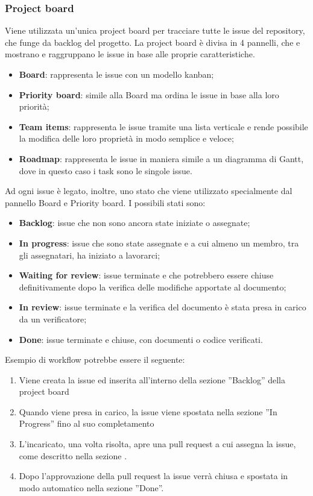 \subsubsection{Project board}\label{inf:pb}
Viene utilizzata un'unica project board per tracciare tutte le issue del
repository, che funge da backlog del progetto. La project board è divisa in 4
pannelli, che e mostrano e raggruppano le issue in base alle proprie
caratteristiche.
\begin{itemize}
    \item \textbf{Board}: rappresenta le issue con un modello kanban;
    \item \textbf{Priority board}: simile alla Board ma ordina le issue in base alla loro priorità;
    \item \textbf{Team items}: rappresenta le issue tramite una lista verticale e rende possibile
          la modifica delle loro proprietà in modo semplice e veloce;
    \item \textbf{Roadmap}: rappresenta le issue in maniera simile a un diagramma di Gantt,
          dove in questo caso i task sono le singole issue.
\end{itemize}
Ad ogni issue è legato, inoltre, uno stato che viene utilizzato specialmente dal pannello Board e Priority board.
I possibili stati sono:
\begin{itemize}
    \item \textbf{Backlog}: issue che non sono ancora state iniziate o assegnate;
    \item \textbf{In progress}: issue che sono state assegnate e a cui almeno un membro, tra gli assegnatari, ha iniziato a lavorarci;
    \item \textbf{Waiting for review}: issue terminate e che potrebbero essere chiuse definitivamente dopo la verifica delle modifiche apportate al documento;
    \item \textbf{In review}: issue terminate e la verifica del documento è stata presa in carico da un verificatore;
    \item \textbf{Done}: issue terminate e chiuse, con documenti o codice verificati.
\end{itemize}
Esempio di workflow potrebbe essere il seguente:
\begin{enumerate}
    \item Viene creata la issue ed inserita all'interno della sezione ”Backlog” della
          project board
    \item Quando viene presa in carico, la issue viene spostata nella sezione ”In
          Progress” fino al suo completamento
    \item L'incaricato, una volta risolta, apre una pull request a cui assegna la issue,
          come descritto nella sezione .
    \item Dopo l'approvazione della pull request la issue verrà chiusa e spostata in modo
          automatico nella sezione ”Done”.
\end{enumerate}

